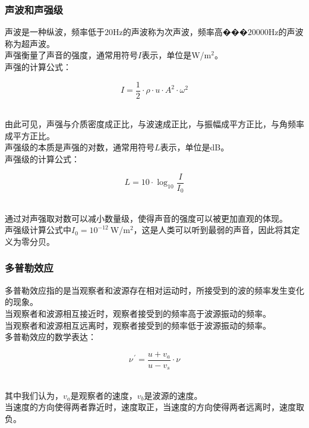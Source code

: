 \documentclass[UTF8]{ctexart}
\begin{document}
\subsubsection{声波和声强级}
    声波是一种纵波，频率低于$20$Hz的声波称为次声波，频率高���$20000$Hz的声波称为超声波。\\[3mm]
    声强衡量了声音的强度，通常用符号$I$表示，单位是W/m$^2$。\\[3mm]
    声强的计算公式：
    \begin{large}
        \begin{equation*}
            I=\frac{1}{2}\cdot\rho\cdot u\cdot A^2\cdot\omega^2
        \end{equation*}
    \end{large}\\
    由此可见，声强与介质密度成正比，与波速成正比，与振幅成平方正比，与角频率成平方正比。\\[5mm]
    声强级的本质是声强的对数，通常用符号$L$表示，单位是dB。\\[3mm]
    声强级的计算公式：
    \begin{large}
        \begin{equation*}
            L=10\cdot\log_{10}{\frac{I}{I_0}}
        \end{equation*}
    \end{large}\\
    通过对声强取对数可以减小数量级，使得声音的强度可以被更加直观的体现。\\[3mm]
    声强级计算公式中$I_0=10^{-12}~$W/m$^2$，这是人类可以听到最弱的声音，因此将其定义为零分贝。

\subsubsection{多普勒效应}
    多普勒效应指的是当观察者和波源存在相对运动时，所接受到的波的频率发生变化的现象。\\[3mm]
    当观察者和波源相互接近时，观察者接受到的频率高于波源振动的频率。\\[2mm]
    当观察者和波源相互远离时，观察者接受到的频率低于波源振动的频率。\\[3mm]
    多普勒效应的数学表达：
    \begin{large}
        \begin{equation*}
            \nu^{\,'}=\frac{u+v_a}{u-v_s}\cdot\nu
        \end{equation*}
    \end{large}\\
    其中我们认为，$v_a$是观察者的速度，$v_b$是波源的速度。\\[3mm]
    当速度的方向使得两者靠近时，速度取正，当速度的方向使得两者远离时，速度取负。
\newpage
\end{document}
